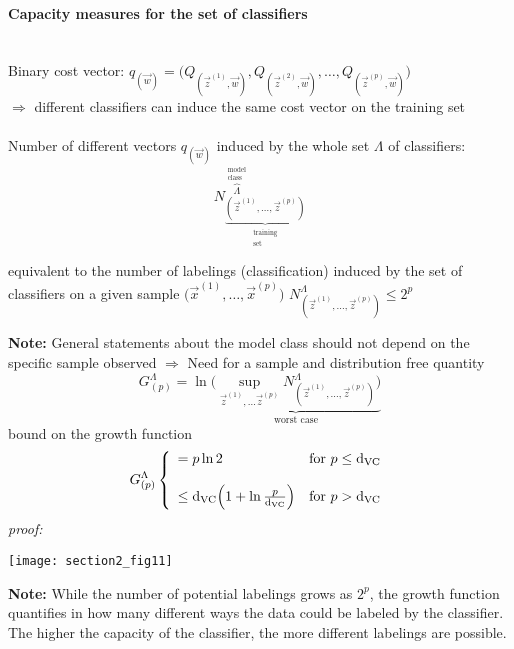 \paragraph{Capacity measures for the set of classifiers}\mbox{}\\
Binary cost vector: $q_{(\vec{w})} = \Big( Q_{(\vec{z}^{(1)}, \vec{w})}, Q_{(\vec{z}^{(2)}, \vec{w})}, \ldots, Q_{(\vec{z}^{(p)}, \vec{w})} \Big)$\\
\indent $\Rightarrow$ different classifiers can induce the same cost vector on the training set 
\\\\
Number of different vectors $q_{(\vec{w})}$ induced by the whole set $\Lambda$ of classifiers:
\begin{equation}
	N_{ \underbrace{ (\vec{z}^{(1)}, \ldots, \vec{z}^{(p)}) }_{
		\substack{\text{training} \\ \text{set}}} }^{
			\overbrace{ \Lambda }^{
				\substack{\text{model} \\ \text{class}}}}
\end{equation}
\begin{itemize}
  \itR equivalent to the number of labelings (classification)
  induced by the set of classifiers on a given sample $\big(
  \vec{x}^{(1)}, \ldots, \vec{x}^{(p)} \big)$
  \itR $N_{(\vec{z}^{(1)}, \ldots, \vec{z}^{(p)})}^\Lambda \leq 2^p$
\end{itemize}
\textbf{Note:} General statements about the model class should not depend on the specific sample observed $\Rightarrow$ Need for a sample and distribution free quantity
\begin{equation} \tag{growth function}
	G_{(p)}^\Lambda = \ln \underbrace{ \bigg( 
		\sup_{\vec{z}^{(1)}, \ldots \vec{z}^{(p)}}
		N_{(\vec{z}^{(1)}, \ldots, \vec{z}^{(p)})}^\Lambda \bigg) }_{
			\text{worst case}}
\end{equation}
bound on the growth function
\begin{equation}
	G_{(p)}^\Lambda
	\left \{ \begin{array}{ll}
		= p \ln 2 
		& \text{for } p \leq \mathrm{d}_{\mathrm{VC}} \\\\
		\leq \mathrm{d}_{\mathrm{VC}} \Big( 1 + \ln \frac{p}{\mathrm{d}_{\mathrm{VC}}} \Big) 
		& \text{for } p > \mathrm{d}_{\mathrm{VC}}
	\end{array} \right.
\end{equation}
{\it proof: \textcite[ch.~4.10]{Vapnik1998}}
\begin{center}\texttt{[image: section2\_fig11]}
\end{center}
\textbf{Note:} While the number of potential labelings grows as $2^p$,
the growth function quantifies in how many different ways the data
could be labeled by the classifier. The higher the capacity of the
classifier, the more different labelings are possible.

